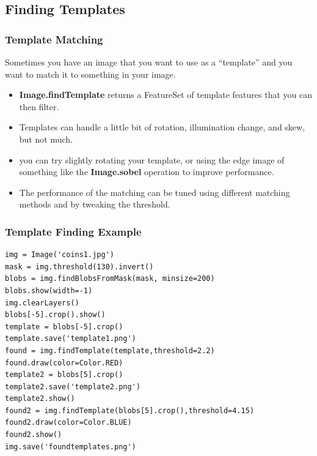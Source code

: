 \documentclass{beamer}
\begin{document}
\subsection{Finding Templates}
\begin{frame}
  \frametitle{Template Matching}
Sometimes you have an image that you want to use as a ``template'' and you
want to match it to something in your image. 
\begin{itemize}
\item \textbf{Image.findTemplate} returns a FeatureSet of template features
  that you can then filter.
\item Templates can handle a little bit of rotation, illumination
  change, and skew, but not much.
\item you can try slightly rotating your template, or using the edge
  image of something like the \textbf{Image.sobel} operation to
  improve performance.
\item The performance of the matching can be tuned using different
  matching methods and by tweaking the threshold.
\end{itemize}
\end{frame}
\begin{frame}[fragile] 
\frametitle{Template Finding Example}
\begin{example}
\begin{verbatim}
img = Image('coins1.jpg')
mask = img.threshold(130).invert()
blobs = img.findBlobsFromMask(mask, minsize=200)
blobs.show(width=-1)
img.clearLayers()
blobs[-5].crop().show()
template = blobs[-5].crop()
template.save('template1.png')
found = img.findTemplate(template,threshold=2.2)
found.draw(color=Color.RED)
template2 = blobs[5].crop()
template2.save('template2.png')
template2.show()
found2 = img.findTemplate(blobs[5].crop(),threshold=4.15)
found2.draw(color=Color.BLUE)
found2.show()
img.save('foundtemplates.png')
\end{verbatim}
\end{example}
\end{frame} 
\end{document}
